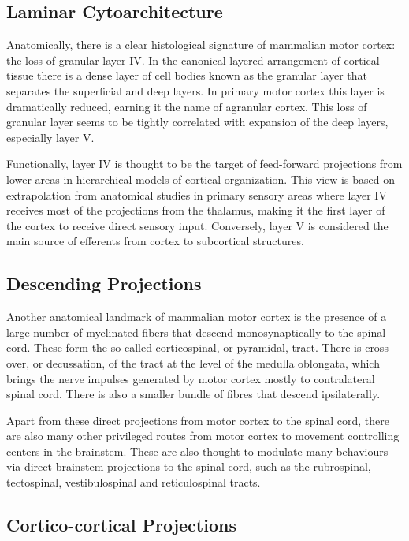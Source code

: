 \subsection{Laminar Cytoarchitecture}

Anatomically, there is a clear histological signature of mammalian motor cortex: the loss of granular layer IV. In the canonical layered arrangement of cortical tissue there is a dense layer of cell bodies known as the granular layer that separates the superficial and deep layers. In primary motor cortex this layer is dramatically reduced, earning it the name of agranular cortex. This loss of granular layer seems to be tightly correlated with expansion of the deep layers, especially layer V.

Functionally, layer IV is thought to be the target of feed-forward projections from lower areas in hierarchical models of cortical organization. This view is based on extrapolation from anatomical studies in primary sensory areas where layer IV receives most of the projections from the thalamus, making it the first layer of the cortex to receive direct sensory input. Conversely, layer V is considered the main source of efferents from cortex to subcortical structures.

\subsection{Descending Projections}

Another anatomical landmark of mammalian motor cortex is the presence of a large number of myelinated fibers that descend monosynaptically to the spinal cord. These form the so-called corticospinal, or pyramidal, tract. There is cross over, or decussation, of the tract at the level of the medulla oblongata, which brings the nerve impulses generated by motor cortex mostly to contralateral spinal cord. There is also a smaller bundle of fibres that descend ipsilaterally.

Apart from these direct projections from motor cortex to the spinal cord, there are also many other privileged routes from motor cortex to movement controlling centers in the brainstem. These are also thought to modulate many behaviours via direct brainstem projections to the spinal cord, such as the rubrospinal, tectospinal, vestibulospinal and reticulospinal tracts.

\subsection{Cortico-cortical Projections}

